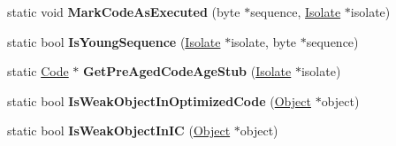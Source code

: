 \begin{DoxyCompactItemize}
\item 
\hypertarget{classv8_1_1internal_1_1_code_a53811e4aff8fc8ebc6f9953d0781e449}{}static void {\bfseries Mark\+Code\+As\+Executed} (byte $\ast$sequence, \hyperlink{classv8_1_1internal_1_1_isolate}{Isolate} $\ast$isolate)\label{classv8_1_1internal_1_1_code_a53811e4aff8fc8ebc6f9953d0781e449}

\item 
\hypertarget{classv8_1_1internal_1_1_code_a4b5476efb1b3a65708c8ee1958e80b3a}{}static bool {\bfseries Is\+Young\+Sequence} (\hyperlink{classv8_1_1internal_1_1_isolate}{Isolate} $\ast$isolate, byte $\ast$sequence)\label{classv8_1_1internal_1_1_code_a4b5476efb1b3a65708c8ee1958e80b3a}

\item 
\hypertarget{classv8_1_1internal_1_1_code_addf72af1609d2e5a159744f586513f11}{}static \hyperlink{classv8_1_1internal_1_1_code}{Code} $\ast$ {\bfseries Get\+Pre\+Aged\+Code\+Age\+Stub} (\hyperlink{classv8_1_1internal_1_1_isolate}{Isolate} $\ast$isolate)\label{classv8_1_1internal_1_1_code_addf72af1609d2e5a159744f586513f11}

\item 
\hypertarget{classv8_1_1internal_1_1_code_a438717a5b3e05f739ad009250a4a1f76}{}static bool {\bfseries Is\+Weak\+Object\+In\+Optimized\+Code} (\hyperlink{classv8_1_1internal_1_1_object}{Object} $\ast$object)\label{classv8_1_1internal_1_1_code_a438717a5b3e05f739ad009250a4a1f76}

\item 
\hypertarget{classv8_1_1internal_1_1_code_aeabe51bd83436966cefdcdd0d6078dd9}{}static bool {\bfseries Is\+Weak\+Object\+In\+I\+C} (\hyperlink{classv8_1_1internal_1_1_object}{Object} $\ast$object)\label{classv8_1_1internal_1_1_code_aeabe51bd83436966cefdcdd0d6078dd9}

\end{DoxyCompactItemize}

